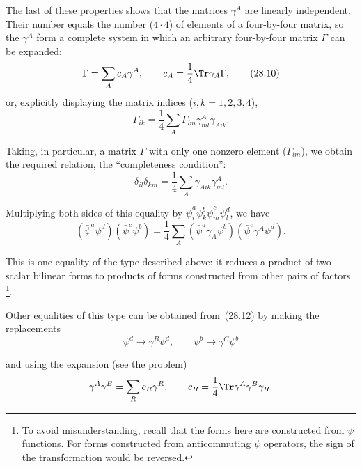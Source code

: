 The last of these properties shows that the matrices $\gamma^A$ are linearly independent. Their number equals the number ($4 \cdot 4$) of elements of a four-by-four matrix, so the $\gamma^A$ form a complete system in which an arbitrary four-by-four matrix $\Gamma$ can be expanded:
\begin{equation}
\Gamma = \sum_A c_A\gamma^A,\qquad c_A = \frac{1}{4}\Tr\gamma_A\Gamma,
\tag{28.10}
\end{equation}
or, explicitly displaying the matrix indices ($i, k = 1, 2, 3, 4$),
\[
\Gamma_{ik} = \frac{1}{4}\sum_A\Gamma_{lm}\gamma^A_{ml}\gamma_{Aik}.
\]

Taking, in particular, a matrix $\Gamma$ with only one nonzero element ($\Gamma_{lm}$), we obtain the required relation, the ``completeness condition'':
\begin{equation}
\delta_{il}\delta_{km} = \frac{1}{4}\sum_A\gamma_{Aik}\gamma^A_{ml}.
\tag{28.11}
\end{equation}

Multiplying both sides of this equality by $\bar\psi^a_i\psi^b_k\bar\psi^c_m\psi^d_l$, we have
\begin{equation}
(\bar\psi^a\psi^d)(\bar\psi^c\psi^b) = \frac{1}{4}\sum_A(\bar\psi^a\gamma_A\psi^b)(\bar\psi^c\gamma^A\psi^d).
\tag{28.12}
\end{equation}

This is one equality of the type described above: it reduces a product of two scalar bilinear forms to products of forms constructed from other pairs of factors\,\footnote{To avoid misunderstanding, recall that the forms here are constructed from $\psi$ functions. For forms constructed from anticommuting $\psi$ operators, the sign of the transformation would be reversed.}.

Other equalities of this type can be obtained from~(28.12) by making the replacements
\[
\psi^d \to \gamma^B\psi^d,\qquad \psi^b \to \gamma^C\psi^b
\]

and using the expansion (see the problem)
\[
\gamma^A\gamma^B = \sum_R c_R\gamma^R,\qquad c_R = \frac{1}{4}\Tr\gamma^A\gamma^B\gamma_R.
\]

